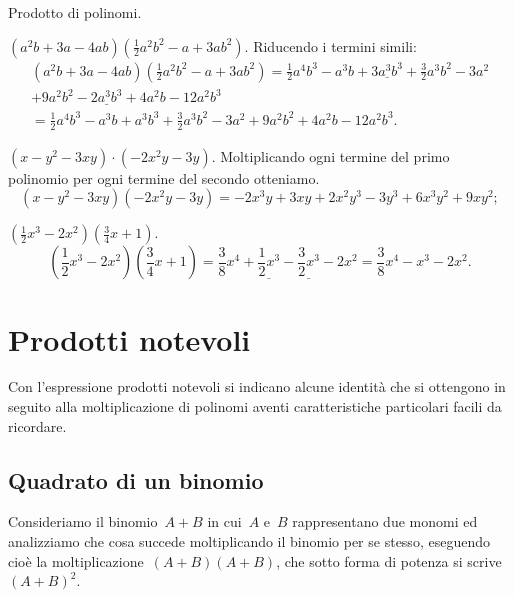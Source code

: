 \begin{exrig}
 \begin{esempio}
 Prodotto di polinomi.

 \begin{enumeratea}
   \item $\left(a^{2}b+3a-4{ab}\right)\left(\frac{1}{2}a^{2}b^{2}-a+3{ab}^{2}\right).$ Riducendo i termini simili:
 \begin{multline*}
  \left(a^{2}b+3a-4{ab}\right)\left(\frac{1}{2}a^{2}b^{2}-a+3{ab}^{2}\right)=%
   \frac{1}{2}a^{4}b^{3}-a^{3}b+\underline{3a^{3}b^{3}}+\frac{3}{2}a^{3}b^{2}-3a^{2}\\
   +9a^{2}b^{2} -\underline{2a^{3}b^{3}}+4a^{2}b-12a^{2}b^{3}\\
  =\frac{1}{2}a^{4}b^{3}-a^{3}b+a^{3}b^{3}+\frac{3}{2}a^{3}b^{2}-3a^{2}+9a^{2}b^{2}+4a^{2}b-12a^{2}b^{3}.
 \end{multline*}
 \item  $\left(x-y^{2}-3{xy}\right)\cdot \left(-2x^{2}y-3y\right).$
 Moltiplicando ogni termine del primo polinomio per ogni termine del
secondo otteniamo.
\[\left(x-y^{2}-3{xy}\right)\left(-2x^{2}y-3y\right)=-2x^{3}y+3{xy}+2x^{2}y^{3}-3y^{3}+6x^{3}y^{2}+9{xy}^{2};\]

 \item $\left(\frac{1}{2}x^{3}-2x^{2}\right)\left(\frac{3}{4}x+1\right)$.
 \[\left(\frac{1}{2}x^{3}-2x^{2}\right)\left(\frac{3}{4}x+1\right)=\frac{3}{8}x^{4}+\underline{\frac{1}{2}x^{3}}-\underline{\frac{3}{2}x^{3}}-2x^{2}=\frac{3}{8}x^{4}-x^{3}-2x^{2}.\]
 \end{enumeratea}
 \end{esempio}
\end{exrig}

\section{Prodotti notevoli}

Con l'espressione prodotti notevoli si indicano alcune
identità che si ottengono in seguito alla moltiplicazione di polinomi
aventi caratteristiche particolari facili da ricordare.

\subsection{Quadrato di un binomio}
\label{subsec:11_prodnot_quadratobinomio}

Consideriamo il binomio~$A+B$ in cui~$A$ e~$B$ rappresentano due monomi ed
analizziamo che cosa succede moltiplicando il binomio per se
stesso, eseguendo cioè la
moltiplicazione~$\left(A+B\right)\left(A+B\right)$, che sotto forma di potenza si scrive~$\left(A+B\right)^{2}$.

